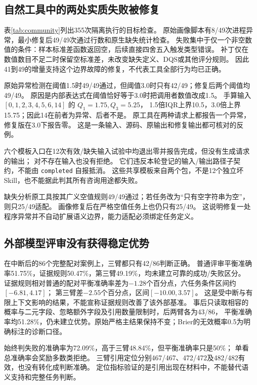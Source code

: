 \subsection{自然工具中的两处实质失败被修复}

表\ref{tab:community}列出355次隔离执行的目标检查。
原始画像脚本有8/49次进程异常，最小修复后49/49次通过行数和原生缺失统计检查。
失败集中于仅一个非空数值的条件：样本标准差函数返回空，后续直接四舍五入触发类型错误。
补丁仅在数值数目不足二时保留空标准差，未改变缺失定义、DQS或其他评分规则。
因此41到49的增量支持这个边界故障的修复，不代表工具全部行为均已正确。

原始异常检测在阈值1.5时49/49通过，但阈值3.0时只有42/49；修复后两个阈值均49/49。
原因是内部表达式在阈值恰好等于3.0时把调用者数值改成1.5。
手算输入 $[0,1,2,3,4,5,6,14]$ 的 $Q_1=1.75,Q_3=5.25$，
1.5倍IQR上界10.5，3.0倍上界15.75；因此14在前者为异常、后者不是。
原工具在两种请求上都报告一个异常，修复版在3.0下报告零。
这是一条输入、源码、原输出和修复输出都可核对的反例。

六个模板入口在12次有效/缺失输入试验中均退出零并报告完成，但没有生成请求的输出；
对不存在输入也没有拒绝。
它们违反本轮登记的输入/输出路径子契约，不能由 \texttt{completed} 自报抵消。
这些共享模板来自两个包，不是12个独立坏Skill，也不能据此判其所有咨询用途都失败。

缺失分析原工具按其广义空值规则49/49通过；若任务改为“只有空字符串为空”，则只25/49适配。
画像修复后在严格空值任务上也仍只有25/49。
这说明修复一处程序异常并不自动扩展语义边界，能力适配必须绑定任务定义。

\subsection{外部模型评审没有获得稳定优势}


在中断后的86个完整配对案例上，三臂都只有42/86判断正确。
普通评审平衡准确率51.75\%，证据规则50.47\%，第三臂49.19\%，均未建立可靠的成功/失败区分。
证据规则相对普通的配对平衡准确率差为$-1.28$个百分点，六任务条件区间约$[-6.81,4.17]$；
第三臂差$-2.55$个百分点，区间$[-10.00,3.57]$。
这是受中断与有限上下文影响的结果，不能宣称证据规则改善了该外部基准。
事后只读取相容的概率与二元字段、忽略额外字段及引用数量限制时，后两臂各为43/86，
平衡准确率均51.28\%，仍未建立优势。原始严格主结果保持不变；Brier的无效概率0.5为明确标注的诊断口径。

始终判失败的准确率为72.09\%，高于三臂48.84\%，但平衡准确率只是50\%；
单看总准确率会奖励多数类拒绝。
三臂引用定位分别467/467、472/472及482/482有效，也没有转化成判断准确。
定位指标验证的是引用出现在材料中，不能替代语义支持和完整任务判断。

